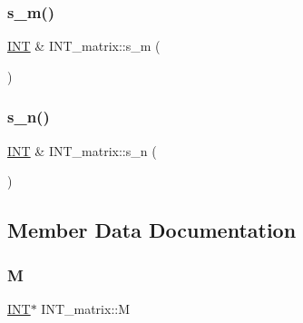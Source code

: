 \mbox{\label{class_i_n_t__matrix_a973ad2dc199432b050a81eda1d75c986}} 
\subsubsection{\texorpdfstring{s\+\_\+m()}{s\_m()}}
{\footnotesize\ttfamily \mbox{\hyperlink{galois_8h_a09fddde158a3a20bd2dcadb609de11dc}{I\+NT}} \& I\+N\+T\+\_\+matrix\+::s\+\_\+m (\begin{DoxyParamCaption}{ }\end{DoxyParamCaption})}

\mbox{\label{class_i_n_t__matrix_a013698dd4d01e810a83adef8bb92df03}} 
\subsubsection{\texorpdfstring{s\+\_\+n()}{s\_n()}}
{\footnotesize\ttfamily \mbox{\hyperlink{galois_8h_a09fddde158a3a20bd2dcadb609de11dc}{I\+NT}} \& I\+N\+T\+\_\+matrix\+::s\+\_\+n (\begin{DoxyParamCaption}{ }\end{DoxyParamCaption})}



\subsection{Member Data Documentation}
\mbox{\label{class_i_n_t__matrix_a1606a8dc98ede12b2aac3a706fe47528}} 
\subsubsection{\texorpdfstring{M}{M}}
{\footnotesize\ttfamily \mbox{\hyperlink{galois_8h_a09fddde158a3a20bd2dcadb609de11dc}{I\+NT}}$\ast$ I\+N\+T\+\_\+matrix\+::M}

\mbox{\label{class_i_n_t__matrix_a15b2c0e2ff35acea0ee975e3c1044c5f}} 
